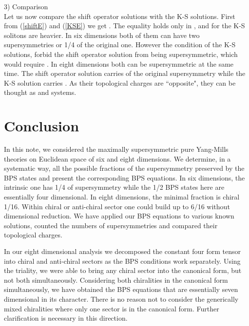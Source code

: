 \documentclass[a4paper,11pt]{article}
\begin{document}
3) Comparison\\
Let us now compare the shift operator solutions with the K-S solutions. First from  (\ref{shiftE}) and (\ref{KSE})  we get \coordHE{}. The equality holds only in \coordHE{}, and for \coordHE{} the K-S solitons are heavier. In six dimensions both of them can have two
supersymmetries or 1/4 of the original one. However the \coordHE{} condition  of the K-S solutions, \coordHE{} forbid the
shift operator solution from being supersymmetric, which would require \coordHE{}.   In eight dimensions both can be
supersymmetric  at the same time. The shift operator solution carries \coordHE{} of the original supersymmetry while the K-S solution carries \coordHE{}. As
their topological charges are ``opposite", they can be thought as \coordHE{} and \coordHE{} systems.



\section{Conclusion\label{CONCLUSION}}

In  this note, we considered the maximally supersymmetric pure Yang-Mills theories on Euclidean space of six and eight dimensions. We determine, in
a systematic way,  all the possible fractions of the supersymmetry preserved by the BPS states and present the corresponding BPS equations. In six
dimensions, the intrinsic one has 1/4 of supersymmetry while the   1/2 BPS states here are essentially four dimensional. In eight dimensions, the
minimal fraction is chiral 1/16. Within chiral or anti-chiral sector one could build up to 6/16 without dimensional reduction. We have applied our
BPS equations to various known solutions, counted the numbers of supersymmetries and compared their topological charges.

In our eight dimensional analysis  we decomposed the constant four form tensor into chiral and anti-chiral sectors as the BPS conditions work
separately. Using the \coordHE{} triality, we were able to bring any   chiral sector into the canonical form, but not both simultaneously.
Considering both chiralities in the canonical form simultaneously, we have obtained the BPS equations that are essentially seven dimensional in its
character. There is no reason not to consider the generically  mixed chiralities  where only one sector is in the canonical form. Further
clarification is necessary in this direction.
\end{document}
